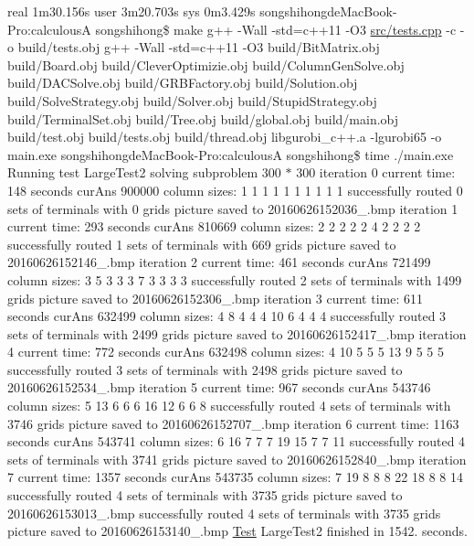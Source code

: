 real 1m30.\+156s user 3m20.\+703s sys 0m3.\+429s songshihongde\+Mac\+Book-\/\+Pro\+:calculousA songshihong\$ make g++ -\/\+Wall -\/std=c++11 -\/\+O3 \hyperlink{tests_8cpp}{src/tests.\+cpp} -\/c -\/o build/tests.\+obj g++ -\/\+Wall -\/std=c++11 -\/\+O3 build/\+Bit\+Matrix.\+obj build/\+Board.\+obj build/\+Clever\+Optimizie.\+obj build/\+Column\+Gen\+Solve.\+obj build/\+D\+A\+C\+Solve.\+obj build/\+G\+R\+B\+Factory.\+obj build/\+Solution.\+obj build/\+Solve\+Strategy.\+obj build/\+Solver.\+obj build/\+Stupid\+Strategy.\+obj build/\+Terminal\+Set.\+obj build/\+Tree.\+obj build/global.\+obj build/main.\+obj build/test.\+obj build/tests.\+obj build/thread.\+obj libgurobi\+\_\+c++.a -\/lgurobi65 -\/o main.\+exe songshihongde\+Mac\+Book-\/\+Pro\+:calculousA songshihong\$ time ./main.exe Running test Large\+Test2 solving subproblem 300 $\ast$ 300 iteration 0 current time\+: 148 seconds cur\+Ans 900000 column sizes\+: 1 1 1 1 1 1 1 1 1 1 successfully routed 0 sets of terminals with 0 grids picture saved to 20160626152036\+\_.\+bmp iteration 1 current time\+: 293 seconds cur\+Ans 810669 column sizes\+: 2 2 2 2 2 4 2 2 2 2 successfully routed 1 sets of terminals with 669 grids picture saved to 20160626152146\+\_.\+bmp iteration 2 current time\+: 461 seconds cur\+Ans 721499 column sizes\+: 3 5 3 3 3 7 3 3 3 3 successfully routed 2 sets of terminals with 1499 grids picture saved to 20160626152306\+\_.\+bmp iteration 3 current time\+: 611 seconds cur\+Ans 632499 column sizes\+: 4 8 4 4 4 10 6 4 4 4 successfully routed 3 sets of terminals with 2499 grids picture saved to 20160626152417\+\_.\+bmp iteration 4 current time\+: 772 seconds cur\+Ans 632498 column sizes\+: 4 10 5 5 5 13 9 5 5 5 successfully routed 3 sets of terminals with 2498 grids picture saved to 20160626152534\+\_.\+bmp iteration 5 current time\+: 967 seconds cur\+Ans 543746 column sizes\+: 5 13 6 6 6 16 12 6 6 8 successfully routed 4 sets of terminals with 3746 grids picture saved to 20160626152707\+\_.\+bmp iteration 6 current time\+: 1163 seconds cur\+Ans 543741 column sizes\+: 6 16 7 7 7 19 15 7 7 11 successfully routed 4 sets of terminals with 3741 grids picture saved to 20160626152840\+\_.\+bmp iteration 7 current time\+: 1357 seconds cur\+Ans 543735 column sizes\+: 7 19 8 8 8 22 18 8 8 14 successfully routed 4 sets of terminals with 3735 grids picture saved to 20160626153013\+\_.\+bmp successfully routed 4 sets of terminals with 3735 grids picture saved to 20160626153140\+\_.\+bmp \hyperlink{classTest}{Test} Large\+Test2 finished in 1542. seconds.

